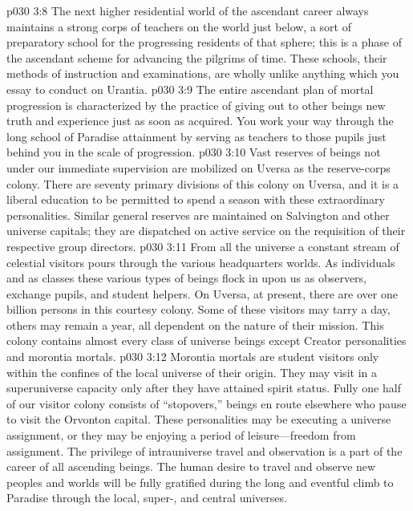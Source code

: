\pc \vs p030 3:8 \bibnobreakspace {} The next higher residential world of the ascendant career always maintains a strong corps of teachers on the world just below, a sort of preparatory school for the progressing residents of that sphere; this is a phase of the ascendant scheme for advancing the pilgrims of time. These schools, their methods of instruction and examinations, are wholly unlike anything which you essay to conduct on Urantia.
\vs p030 3:9 The entire ascendant plan of mortal progression is characterized by the practice of giving out to other beings new truth and experience just as soon as acquired. You work your way through the long school of Paradise attainment by serving as teachers to those pupils just behind you in the scale of progression.
\pc \vs p030 3:10 \bibnobreakspace {} Vast reserves of beings not under our immediate supervision are mobilized on Uversa as the reserve\hyp{}corps colony. There are seventy primary divisions of this colony on Uversa, and it is a liberal education to be permitted to spend a season with these extraordinary personalities. Similar general reserves are maintained on Salvington and other universe capitals; they are dispatched on active service on the requisition of their respective group directors.
\pc \vs p030 3:11 \bibnobreakspace {} From all the universe a constant stream of celestial visitors pours through the various headquarters worlds. As individuals and as classes these various types of beings flock in upon us as observers, exchange pupils, and student helpers. On Uversa, at present, there are over one billion persons in this courtesy colony. Some of these visitors may tarry a day, others may remain a year, all dependent on the nature of their mission. This colony contains almost every class of universe beings except Creator personalities and morontia mortals.
\vs p030 3:12 Morontia mortals are student visitors only within the confines of the local universe of their origin. They may visit in a superuniverse capacity only after they have attained spirit status. Fully one half of our visitor colony consists of “stopovers,” beings en route elsewhere who pause to visit the Orvonton capital. These personalities may be executing a universe assignment, or they may be enjoying a period of leisure---freedom from assignment. The privilege of intrauniverse travel and observation is a part of the career of all ascending beings. The human desire to travel and observe new peoples and worlds will be fully gratified during the long and eventful climb to Paradise through the local, super-, and central universes.
